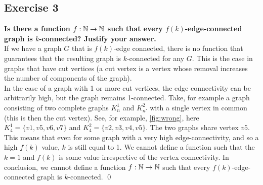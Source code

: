 \subsection*{Exercise 3}
\boldmath\textbf{Is there a function $f: \mathbb{N} \rightarrow \mathbb{N}$ such that every $f(k)$-edge-connected graph is $k$-connected? Justify your answer.\\
\linebreak}
\unboldmath
If we have a graph $G$ that is $f(k)$-edge connected, there is no function that guarantees that the resulting graph is $k$-connected for any $G$. This is the case in graphs that have cut vertices (a cut vertex is a vertex whose removal increases the number of components of the graph). \\
\linebreak 
In the case of a graph with 1 or more cut vertices, the edge connectivity can be arbitrarily high, but the graph remains 1-connected. Take, for example a graph consisting of two complete graphs $K^1_n$ and $K^2_{n'}$ with a single vertex in common (this is then the cut vertex). See, for example, \ref{fig:wrong}, here $K^1_4 = \{v1, v5, v6, v7\}$ and $K^2_4 = \{v2, v3, v4, v5\}$. The two graphs share vertex $v5$. \\
\linebreak
This means that even for some graph with a very high edge-connectivity, and so a high $f(k)$ value, $k$ is still equal to 1. We cannot define a function such that the $k = 1$ and $f(k)$ is some value irrespective of the vertex connectivity. In conclusion, we cannot define a function $f: \mathbb{N} \rightarrow \mathbb{N}$ such that every $f(k)$-edge-connected graph is $k$-connected. \qed
